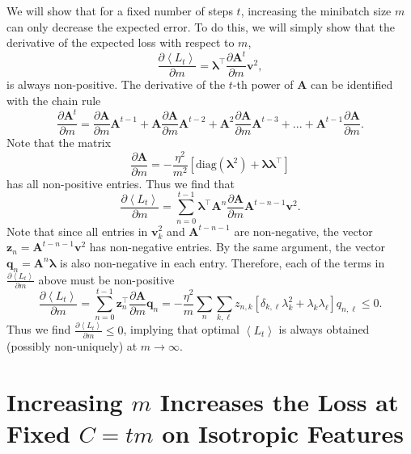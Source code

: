 \documentclass{article} %
\def\A{\mathbf A}
\begin{document}
We will show that for a fixed number of steps $t$, increasing the minibatch size $m$ can only decrease the expected error. To do this, we will simply show that the derivative of the expected loss with respect to $m$,
\begin{equation}
    \frac{\partial \left<L_t\right>}{\partial m} =  \bm\lambda^\top \frac{\partial \A^t}{\partial m} \mathbf{v}^2,
\end{equation}
is always non-positive. The derivative of the $t$-th power of $\A$ can be identified with the chain rule
\begin{equation}
    \frac{\partial \A^t}{\partial m} = \frac{\partial \A}{\partial m} \A^{t-1} + \A \frac{\partial \A}{\partial m} \A^{t-2} + \A^2 \frac{\partial \A}{\partial m} \A^{t-3} + ... + \A^{t-1}  \frac{\partial \A}{\partial m}.
\end{equation}
%
Note that the matrix
\begin{equation}
    \frac{\partial \A}{\partial m} = - \frac{\eta^2}{m^2}\left[ \text{diag}(\bm\lambda^2) + \bm\lambda\bm\lambda^\top \right]
\end{equation}
has all non-positive entries. Thus we find that
\begin{equation}
    \frac{\partial \left< L_t \right>}{\partial m} = \sum_{n=0}^{t-1} \bm\lambda^\top \A^n  \frac{\partial \A}{\partial m} \A^{t-n-1} \mathbf{v}^2.
\end{equation}
%
Note that since all entries in $\mathbf{v}_k^2$ and $\A^{t-n-1}$ are non-negative, the vector $\bm{z}_n = \A^{t-n-1} \mathbf{v}^2$ has non-negative entries. By the same argument, the vector $\bm{q}_n = \A^{n} \bm\lambda$ is also non-negative in each entry. Therefore, each of the terms in $\frac{\partial \left< L_t \right>}{\partial m}$ above must be non-positive 
\begin{equation}
    \frac{\partial \left< L_t \right>}{\partial m} = \sum_{n=0}^{t-1} \bm z_n^\top \frac{\partial \A}{\partial m} \bm q_n = - \frac{\eta^2}{m} \sum_{n} \sum_{k,\ell} z_{n,k} \left[ \delta_{k,\ell} \lambda_k^2 + \lambda_k \lambda_\ell  \right] q_{n,\ell} \leq 0.
\end{equation}
%
Thus we find $\frac{\partial \left< L_t \right>}{\partial m} \leq 0$, implying that optimal $\left< L_t\right>$ is always obtained (possibly non-uniquely) at $m \to \infty$.

\section{Increasing $m$ Increases the Loss at Fixed $C = tm$ on Isotropic Features}\label{fixed_compute_minibatch}
\end{document}
